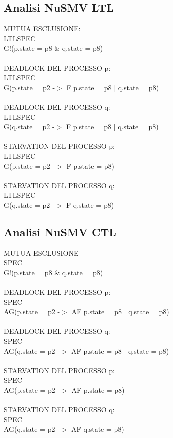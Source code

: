 \documentclass{article}
\begin{document}
\subsection{Analisi NuSMV LTL}
MUTUA ESCLUSIONE:
\\LTLSPEC
\\G!(p.state = p8 \& q.state = p8)
\\\\DEADLOCK DEL PROCESSO p:
\\LTLSPEC
\\G(p.state = p2 -$>$ F p.state = p8 $|$ q.state = p8)
\\\\DEADLOCK DEL PROCESSO q:
\\LTLSPEC
\\G(q.state = p2 -$>$ F p.state = p8 $|$ q.state = p8)
\\\\STARVATION DEL PROCESSO p:
\\LTLSPEC
\\G(p.state = p2 -$>$ F p.state = p8)
\\\\STARVATION DEL PROCESSO q:
\\LTLSPEC
\\G(q.state = p2 -$>$ F q.state = p8)
\subsection{Analisi NuSMV CTL}
MUTUA ESCLUSIONE
\\SPEC
\\G!(p.state = p8 \& q.state = p8)
\\\\DEADLOCK DEL PROCESSO p:
\\SPEC
\\AG(p.state = p2 -$>$ AF p.state = p8 $|$ q.state = p8)
\\\\DEADLOCK DEL PROCESSO q:
\\SPEC
\\AG(q.state = p2 -$>$ AF p.state = p8 $|$ q.state = p8)
\\\\STARVATION DEL PROCESSO p:
\\SPEC
\\AG(p.state = p2 -$>$ AF p.state = p8)
\\\\STARVATION DEL PROCESSO q:
\\SPEC
\\AG(q.state = p2 -$>$ AF q.state = p8)
\end{document}

